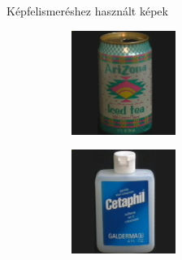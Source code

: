 \documentclass{beamer}
\begin{document}
\begin{frame}{Képfelismeréshez használt képek}
    \vskip 12mm
    \begin{figure}
        \begin{subfigure}{55pt}
            \centering
        \includegraphics[width=\textwidth]{figures/coil_original/7.png}
        
        \end{subfigure}
        \begin{subfigure}{55pt}
            \centering
        \includegraphics[width=\textwidth]{figures/coil_original/13.png}
        

\end{subfigure}
\end{figure}
\end{frame}
\end{document}

